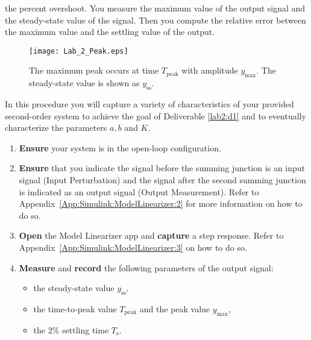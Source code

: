 the percent overshoot. You measure the maximum value of the output
signal and the steady-state value of the signal. Then you
compute the relative error between the maximum value and the settling value of
the output.
%
\begin{figure}
  \texttt{[image: Lab\_2\_Peak.eps]}
  \caption[Depicting Overshoot Measurements for a Second-Order System.]{%
    The maximum peak occurs at time \(T_\mathrm{peak}\) with amplitude
    \(y_\mathrm{max}.\) The steady-state value is shown as \(y_{\mathrm{ss}}.\)
  }
  \label{fig:lab2:peak}
\end{figure}
%
\begin{procedure}[label={proc:lab2:p1}]
  In this procedure you will capture a variety of characteristics of
  your provided second-order system to achieve the goal of Deliverable
  \ref{lab2:d1} and to eventually characterize the parameters \(a,\)\(b\)
  and \(K.\)
  \begin{enumerate}[label=(\arabic*)]
    \item{
      \textbf{Ensure} your system is in the open-loop configuration.
    }
    \item{
      \textbf{Ensure} that you indicate the signal before the summing junction
      is an input signal (Input Perturbation) and the signal after the second summing junction is indicated as an output signal (Output Measurement).
      Refer to Appendix~\ref{App:Simulink:ModelLinearizer:2} for more information on how to do so.
    }
    \item{
      \textbf{Open} the Model Linearizer app and \textbf{capture} a
      step response. Refer to Appendix~\ref{App:Simulink:ModelLinearizer:3}
      on how to do so.
    }
    \item{
      \textbf{Measure} and \textbf{record} the following parameters of the
      output signal:
      \begin{itemize}
        \item{
          the steady-state value \(y_{\mathrm{ss}},\)
        }
        \item{
          the time-to-peak value \(T_{\mathrm{peak}}\) and
          the peak value \(y_{\mathrm{max}},\)
        }
        \item{
          the \(2\%\) settling time \(T_{\mathrm{s}}.\)
        }
      \end{itemize}
      \label{proc:lab2:p1:4}
    }
  \end{enumerate}
\end{procedure}

